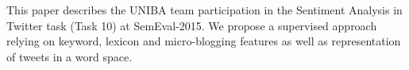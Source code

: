 This paper describes the UNIBA team participation in the Sentiment Analysis in Twitter task (Task 10) at SemEval-2015. We propose a supervised approach relying on keyword, lexicon and micro-blogging features as well as representation of tweets in a word space.
